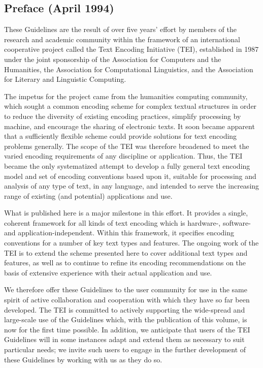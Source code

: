 \subsection[{Preface (April 1994)}]{Preface (April 1994)}\label{PF}\par
These Guidelines are the result of over five years' effort by members of the research and academic community within the framework of an international cooperative project called the Text Encoding Initiative (TEI), established in 1987 under the joint sponsorship of the Association for Computers and the Humanities, the Association for Computational Linguistics, and the Association for Literary and Linguistic Computing. \par
The impetus for the project came from the humanities computing community, which sought a common encoding scheme for complex textual structures in order to reduce the diversity of existing encoding practices, simplify processing by machine, and encourage the sharing of electronic texts. It soon became apparent that a sufficiently flexible scheme could provide solutions for text encoding problems generally. The scope of the TEI was therefore broadened to meet the varied encoding requirements of any discipline or application. Thus, the TEI became the only systematized attempt to develop a fully general text encoding model and set of encoding conventions based upon it, suitable for processing and analysis of any type of text, in any language, and intended to serve the increasing range of existing (and potential) applications and use. \par
What is published here is a major milestone in this effort. It provides a single, coherent framework for all kinds of text encoding which is hardware-, software- and application-independent. Within this framework, it specifies encoding conventions for a number of key text types and features. The ongoing work of the TEI is to extend the scheme presented here to cover additional text types and features, as well as to continue to refine its encoding recommendations on the basis of extensive experience with their actual application and use. \par
We therefore offer these Guidelines to the user community for use in the same spirit of active collaboration and cooperation with which they have so far been developed. The TEI is committed to actively supporting the wide-spread and large-scale use of the Guidelines which, with the publication of this volume, is now for the first time possible. In addition, we anticipate that users of the TEI Guidelines will in some instances adapt and extend them as necessary to suit particular needs; we invite such users to engage in the further development of these Guidelines by working with us as they do so. \par
